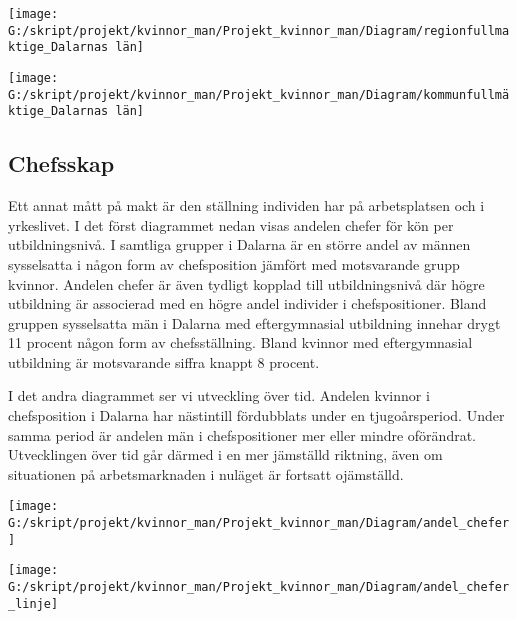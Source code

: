 \documentclass[
]{article}
\begin{document}
\begin{center}\texttt{[image: G:/skript/projekt/kvinnor\_man/Projekt\_kvinnor\_man/Diagram/regionfullmaktige\_Dalarnas län]} \end{center}

\begin{center}\texttt{[image: G:/skript/projekt/kvinnor\_man/Projekt\_kvinnor\_man/Diagram/kommunfullmäktige\_Dalarnas län]} \end{center}

\hypertarget{chefsskap}{%
\subsection{Chefsskap}\label{chefsskap}}

Ett annat mått på makt är den ställning individen har på arbetsplatsen
och i yrkeslivet. I det först diagrammet nedan visas andelen chefer för
kön per utbildningsnivå. I samtliga grupper i Dalarna är en större andel
av männen sysselsatta i någon form av chefsposition jämfört med
motsvarande grupp kvinnor. Andelen chefer är även tydligt kopplad till
utbildningsnivå där högre utbildning är associerad med en högre andel
individer i chefspositioner. Bland gruppen sysselsatta män i Dalarna med
eftergymnasial utbildning innehar drygt 11 procent någon form av
chefsställning. Bland kvinnor med eftergymnasial utbildning är
motsvarande siffra knappt 8 procent.

I det andra diagrammet ser vi utveckling över tid. Andelen kvinnor i
chefsposition i Dalarna har nästintill fördubblats under en
tjugoårsperiod. Under samma period är andelen män i chefspositioner mer
eller mindre oförändrat. Utvecklingen över tid går därmed i en mer
jämställd riktning, även om situationen på arbetsmarknaden i nuläget är
fortsatt ojämställd.

\begin{center}\texttt{[image: G:/skript/projekt/kvinnor\_man/Projekt\_kvinnor\_man/Diagram/andel\_chefer]} \end{center}

\begin{center}\texttt{[image: G:/skript/projekt/kvinnor\_man/Projekt\_kvinnor\_man/Diagram/andel\_chefer\_linje]} \end{center}
\end{document}
